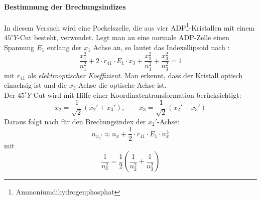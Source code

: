 \paragraph{Bestimmung der Brechungsindizes}
In diesem Versuch wird eine Pockelszelle, die aus vier ADP\footnote{Ammoniumdihydrogenphosphat}-Kristallen mit einem $45^\circ Y$-Cut besteht, 
verwendet. Legt man an eine normale ADP-Zelle einen Spannung $E_1$ entlang der $x_1$ Achse an, so lautet das Indexellipsoid nach \cite{manual}:
\begin{equation}
  \frac{x_1^2}{n_1^2} + 2 \cdot r_{41} \cdot E_1 \cdot x_3 + \frac{x_2^2}{n_1^2} + \frac{x_3^2}{n_3^2} = 1
\end{equation}
mit $r_{41}$ als \emph{elektrooptischer Koeffizient}. Man erkennt, dass der Kristall optisch einachsig ist und die $x_3$-Achse die optische Achse ist. \\
Der $45^\circ Y$-Cut wird mit Hilfe einer Koordinatentransformation berücksichtigt:
\begin{equation}
  x_2 = \frac{1}{\sqrt{2}} \left( x_2' + x_3' \right), \qquad x_3 = \frac{1}{\sqrt{2}}(x_2' - x_3')
\end{equation}
Daraus folgt nach \cite{manual} für den Brechungsindex der $x_2'$-Achse:
\begin{equation}
  \label{eq:refindex:x2new}
  n_{x_2'} \approx n_x + \frac{1}{2} \cdot r_{41} \cdot E_1 \cdot n_x^3
\end{equation}
mit
\begin{equation}
  \label{eq:nxdef}
  \frac{1}{n_x^2} = \frac{1}{2} \left( \frac{1}{n_2^2} + \frac{1}{n_3^2} \right)
\end{equation}
